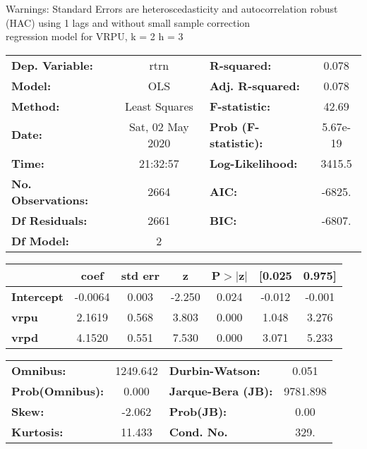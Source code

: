 Warnings: \newline
 [1] Standard Errors are heteroscedasticity and autocorrelation robust (HAC) using 1 lags and without small sample correction\\ 

regression model for VRPU, k = 2 h = 3\begin{center}
\begin{tabular}{lclc}
\toprule
\textbf{Dep. Variable:}    &       rtrn       & \textbf{  R-squared:         } &     0.078   \\
\textbf{Model:}            &       OLS        & \textbf{  Adj. R-squared:    } &     0.078   \\
\textbf{Method:}           &  Least Squares   & \textbf{  F-statistic:       } &     42.69   \\
\textbf{Date:}             & Sat, 02 May 2020 & \textbf{  Prob (F-statistic):} &  5.67e-19   \\
\textbf{Time:}             &     21:32:57     & \textbf{  Log-Likelihood:    } &    3415.5   \\
\textbf{No. Observations:} &        2664      & \textbf{  AIC:               } &    -6825.   \\
\textbf{Df Residuals:}     &        2661      & \textbf{  BIC:               } &    -6807.   \\
\textbf{Df Model:}         &           2      & \textbf{                     } &             \\
\bottomrule
\end{tabular}
\begin{tabular}{lcccccc}
                   & \textbf{coef} & \textbf{std err} & \textbf{z} & \textbf{P$> |$z$|$} & \textbf{[0.025} & \textbf{0.975]}  \\
\midrule
\textbf{Intercept} &      -0.0064  &        0.003     &    -2.250  &         0.024        &       -0.012    &       -0.001     \\
\textbf{vrpu}      &       2.1619  &        0.568     &     3.803  &         0.000        &        1.048    &        3.276     \\
\textbf{vrpd}      &       4.1520  &        0.551     &     7.530  &         0.000        &        3.071    &        5.233     \\
\bottomrule
\end{tabular}
\begin{tabular}{lclc}
\textbf{Omnibus:}       & 1249.642 & \textbf{  Durbin-Watson:     } &    0.051  \\
\textbf{Prob(Omnibus):} &   0.000  & \textbf{  Jarque-Bera (JB):  } & 9781.898  \\
\textbf{Skew:}          &  -2.062  & \textbf{  Prob(JB):          } &     0.00  \\
\textbf{Kurtosis:}      &  11.433  & \textbf{  Cond. No.          } &     329.  \\
\bottomrule
\end{tabular}
\end{center}

